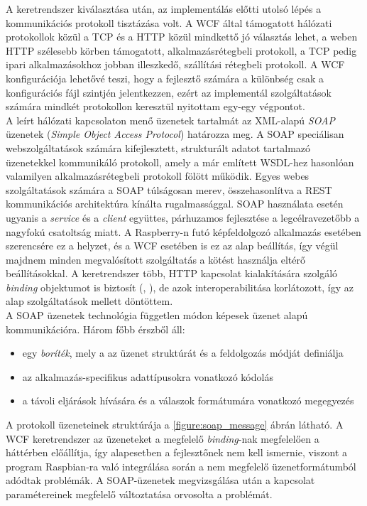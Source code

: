 A keretrendszer kiválasztása után, az implementálás előtti utolsó lépés a kommunikációs protokoll tisztázása volt. A WCF által támogatott hálózati protokollok közül a TCP és a HTTP közül mindkettő jó választás lehet, a weben HTTP szélesebb körben támogatott, alkalmazásrétegbeli protokoll, a TCP pedig ipari alkalmazásokhoz jobban illeszkedő, szállítási rétegbeli protokoll. A WCF konfigurációja lehetővé teszi, hogy a fejlesztő számára a különbség csak a konfigurációs fájl szintjén jelentkezzen, ezért az implementál szolgáltatások számára mindkét protokollon keresztül nyitottam egy-egy végpontot.\\
A leírt hálózati kapcsolaton menő üzenetek tartalmát az XML-alapú \emph{SOAP} üzenetek (\emph{Simple Object Access Protocol}) határozza meg. A SOAP speciálisan webszolgáltatások számára kifejlesztett, strukturált adatot tartalmazó üzenetekkel kommunikáló protokoll, amely a már említett WSDL-hez hasonlóan valamilyen alkalmazásrétegbeli protokoll fölött működik. Egyes webes szolgáltatások számára a SOAP túlságosan merev, összehasonlítva a REST kommunikációs architektúra kínálta rugalmassággal. SOAP használata esetén ugyanis a \emph{service} és a \emph{client} együttes, párhuzamos fejlesztése a legcélravezetőbb a nagyfokú csatoltság miatt. A Raspberry-n futó képfeldolgozó alkalmazás esetében szerencsére ez a helyzet, és a WCF esetében is ez az alap beállítás, így végül majdnem minden megvalósított szolgáltatás a  kötést használja eltérő beállításokkal. A keretrendszer több, HTTP kapcsolat kialakítására szolgáló \emph{binding} objektumot is biztosít (\code{}, \code{} ), de azok interoperabilitása korlátozott, így az alap szolgáltatások mellett döntöttem.\\
A SOAP üzenetek technológia független módon képesek üzenet alapú kommunikációra. Három főbb érszből áll:
\begin{itemize}
\item egy \emph{boríték}, mely a az üzenet struktúrát és a feldolgozás módját definiálja
\item az alkalmazás-specifikus adattípusokra vonatkozó kódolás
\item a távoli eljárások hívására és a válaszok formátumára vonatkozó megegyezés
\end{itemize}
A protokoll üzeneteinek struktúrája a \ref{figure:soap_message} ábrán látható. A WCF keretrendszer az üzeneteket a megfelelő \emph{binding}-nak megfelelően a háttérben előállítja, így alapesetben a fejlesztőnek nem kell ismernie, viszont a program Raspbian-ra való integrálása során a nem megfelelő üzenetformátumból adódtak problémák. A SOAP-üzenetek megvizsgálása után a kapcsolat paramétereinek megfelelő változtatása orvosolta a problémát.

